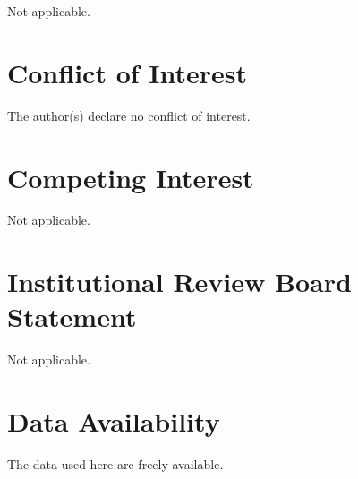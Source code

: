 \documentclass[12pt]{Definitions/academia}
\begin{document}
Not applicable.


\section*{Conflict of Interest}
The author(s) declare no conflict of interest.

\section*{Competing Interest}

Not applicable.

\section*{Institutional Review Board Statement}

Not applicable.


\section*{Data Availability}

The data used here are freely available.
\end{document}
